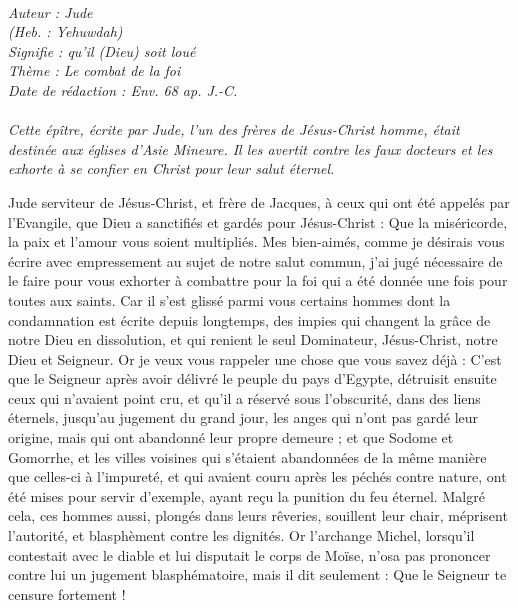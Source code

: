 \BFont
\noindent\hrulefill
{\footnotesize
\textit{
\bigskip
{\centering{}
\\Auteur : Jude
\\(Heb. : Yehuwdah)
\\Signifie : qu'il (Dieu) soit loué
\\Thème : Le combat de la foi
\\Date de rédaction : Env. 68 ap. J.-C.\\}
}
\textit{
\\Cette épître, écrite par Jude, l’un des frères de Jésus-Christ homme, était destinée aux églises d’Asie Mineure. Il les avertit contre les faux docteurs et les exhorte à se confier en Christ pour leur salut éternel.\bigskip
}
}
\par\nobreak\noindent\hrulefill
\begin{multicols}{2}
\VerseOne{}Jude serviteur de Jésus-Christ, et frère de Jacques, à ceux qui ont été appelés par l'Evangile, que Dieu a sanctifiés et gardés pour Jésus-Christ :
Que la miséricorde, la paix et l'amour vous soient multipliés.
Mes bien-aimés, comme je désirais vous écrire avec empressement au sujet de notre salut commun, j’ai jugé nécessaire de le faire pour vous exhorter à combattre pour la foi qui a été donnée une fois pour toutes aux saints.
Car il s’est glissé parmi vous certains hommes dont la condamnation est écrite depuis longtemps, des impies qui changent la grâce de notre Dieu en dissolution, et qui renient le seul Dominateur, Jésus-Christ, notre Dieu et Seigneur.
Or je veux vous rappeler une chose que vous savez déjà : C'est que le Seigneur après avoir délivré le peuple du pays d'Egypte, détruisit ensuite ceux qui n'avaient point cru,
et qu'il a réservé sous l'obscurité, dans des liens éternels, jusqu'au jugement du grand jour, les anges qui n'ont pas gardé leur origine, mais qui ont abandonné leur propre demeure ;
et que Sodome et Gomorrhe, et les villes voisines qui s'étaient abandonnées de la même manière que celles-ci à l'impureté, et qui avaient couru après les péchés contre nature, ont été mises pour servir d'exemple, ayant reçu la punition du feu éternel.  
Malgré cela, ces hommes aussi, plongés dans leurs rêveries, souillent leur chair, méprisent l’autorité, et blasphèment contre les dignités.
Or l'archange Michel, lorsqu’il contestait avec le diable et lui disputait le corps de Moïse, n'osa pas prononcer contre lui un jugement blasphématoire, mais il dit seulement : Que le Seigneur te censure fortement !

\end{multicols}
